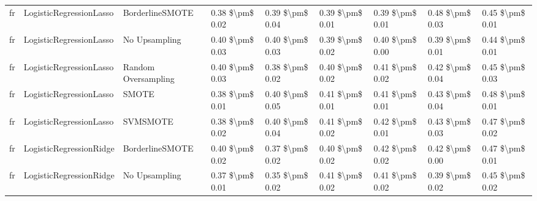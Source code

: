 \begin{tabular}{lllllllll}
      fr &         LogisticRegressionLasso &               BorderlineSMOTE & 0.38 \$\textbackslash pm\$ 0.02 &           0.39 \$\textbackslash pm\$ 0.04 &       0.39 \$\textbackslash pm\$ 0.01 &        0.39 \$\textbackslash pm\$ 0.01 &                         0.48 \$\textbackslash pm\$ 0.03 &     0.45 \$\textbackslash pm\$ 0.01 \\
      fr &         LogisticRegressionLasso &                 No Upsampling & 0.40 \$\textbackslash pm\$ 0.03 &           0.40 \$\textbackslash pm\$ 0.03 &       0.39 \$\textbackslash pm\$ 0.02 &        0.40 \$\textbackslash pm\$ 0.00 &                         0.39 \$\textbackslash pm\$ 0.01 &     0.44 \$\textbackslash pm\$ 0.01 \\
      fr &         LogisticRegressionLasso &           Random Oversampling & 0.40 \$\textbackslash pm\$ 0.03 &           0.38 \$\textbackslash pm\$ 0.02 &       0.40 \$\textbackslash pm\$ 0.02 &        0.41 \$\textbackslash pm\$ 0.02 &                         0.42 \$\textbackslash pm\$ 0.04 &     0.45 \$\textbackslash pm\$ 0.03 \\
      fr &         LogisticRegressionLasso &                         SMOTE & 0.38 \$\textbackslash pm\$ 0.01 &           0.40 \$\textbackslash pm\$ 0.05 &       0.41 \$\textbackslash pm\$ 0.01 &        0.41 \$\textbackslash pm\$ 0.01 &                         0.43 \$\textbackslash pm\$ 0.04 &     0.48 \$\textbackslash pm\$ 0.01 \\
      fr &         LogisticRegressionLasso &                      SVMSMOTE & 0.38 \$\textbackslash pm\$ 0.02 &           0.40 \$\textbackslash pm\$ 0.04 &       0.41 \$\textbackslash pm\$ 0.02 &        0.42 \$\textbackslash pm\$ 0.01 &                         0.43 \$\textbackslash pm\$ 0.03 &     0.47 \$\textbackslash pm\$ 0.02 \\
      fr &         LogisticRegressionRidge &               BorderlineSMOTE & 0.40 \$\textbackslash pm\$ 0.02 &           0.37 \$\textbackslash pm\$ 0.02 &       0.40 \$\textbackslash pm\$ 0.02 &        0.42 \$\textbackslash pm\$ 0.02 &                         0.42 \$\textbackslash pm\$ 0.00 &     0.47 \$\textbackslash pm\$ 0.01 \\
      fr &         LogisticRegressionRidge &                 No Upsampling & 0.37 \$\textbackslash pm\$ 0.01 &           0.35 \$\textbackslash pm\$ 0.02 &       0.41 \$\textbackslash pm\$ 0.02 &        0.41 \$\textbackslash pm\$ 0.02 &                         0.39 \$\textbackslash pm\$ 0.02 &     0.45 \$\textbackslash pm\$ 0.02 \\

\end{tabular}

